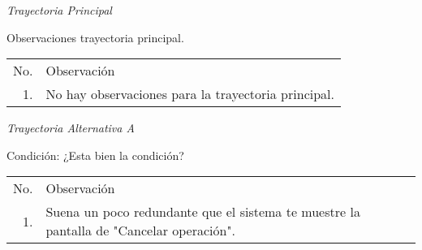 \documentclass[10pt,spanish]{article}
\providecommand{\tabularnewline}{\\}
\begin{document}

\newpage

\textit{\large Trayectoria Principal}{\large {} }{\large \par}

Observaciones trayectoria principal. %
\begin{longtable}{rp{8cm}}
No.  & Observación\tabularnewline
1.  &No hay observaciones para la trayectoria principal. \tabularnewline
\end{longtable}

\textit{Trayectoria Alternativa A}

Condición: ¿Esta bien la condición?

\begin{longtable}{rp{8cm}}
No.  & Observación\tabularnewline
1.  & Suena un poco redundante que el sistema te muestre la pantalla de "Cancelar operación".
\end{longtable}%
\newpage{} 
\end{document}
